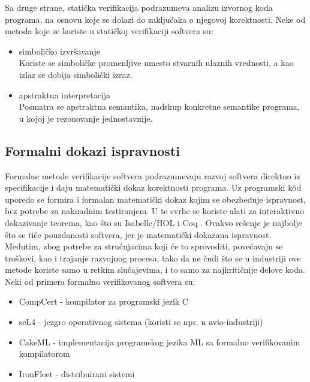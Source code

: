 \documentclass[a4paper]{article}
\begin{document}
Sa druge strane, statička verifikacija podrazumeva analizu izvornog koda programa, na osnovu koje se dolazi do zaključaka o njegovoj korektnosti.
Neke od metoda koje se koriste u statičkoj verifikaciji softvera su:
\begin{itemize}
\item simboličko izvršavanje \cite{symbolic_execution}\\
Koriste se simboličke promenljive umesto stvarnih ulaznih vrednosti, a kao izlaz se dobija simbolički izraz.
\item apstraktna interpretacija \cite{abstract_interpretation}\\
Posmatra se apstraktna semantika, nadskup konkretne semantike programa, u kojoj je rezonovanje jednostavnije.

\end{itemize}

\subsection{Formalni dokazi ispravnosti}
\label{subsec:formalni_dokazi}
Formalne metode verifikacije softvera podrazumevaju razvoj softvera direktno iz specifikacije i daju matematički dokaz korektnosti programa.
Uz programski k\^{o}d uporedo se formira i formalan matematički dokaz kojim se obezbeđuje ispravnost, bez potrebe za naknadnim testiranjem.
U te svrhe se koriste alati za interaktivno dokazivanje teorema, kao što su Isabelle/HOL \cite{isabelle} i Coq \cite{coq}.
Ovakvo rešenje je najbolje što se tiče pouzdanosti softvera, jer je matematički dokazana ispravnost.
Međutim, zbog potrebe za stručnjacima koji će to sprovoditi, povećavaju se troškovi, kao i trajanje razvojnog procesa, tako da ne čudi što se u industriji ove metode koriste samo u retkim slučajevima, i to samo za najkritičnije delove koda.\\
Neki od primera formalno verifikovanog softvera su:
\begin{itemize}
\item CompCert - kompilator za programski jezik C \cite{compcert}
\item seL4 - jezgro operativnog sistema (koristi se npr. u avio-industriji) \cite{sel4}
\item CakeML - implementacija programskog jezika ML sa formalno verifikovanim kompilatorom \cite{cakeml}
\item IronFleet - distribuirani sistemi \cite{ironfleet}
\end{itemize}
\end{document}
